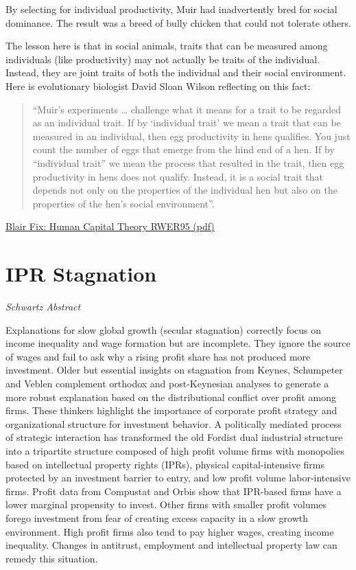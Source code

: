 \documentclass[
]{book}
\begin{document}
By selecting for individual productivity, Muir had inadvertently bred for social dominance.
The result was a breed of bully chicken that could not tolerate others.

The lesson here is that in social animals, traits that can be measured among individuals (like
productivity) may not actually be traits of the individual.
Instead, they are joint traits of both the individual and their social environment.
Here is evolutionary biologist David Sloan Wilson reflecting on this fact:

\begin{quote}
``Muir's experiments \ldots{} challenge what it means for a trait to be regarded as
an individual trait. If by `individual trait' we mean a trait that can be measured
in an individual, then egg productivity in hens qualifies. You just count the
number of eggs that emerge from the hind end of a hen. If by ``individual trait''
we mean the process that resulted in the trait, then egg productivity in hens
does not qualify. Instead, it is a social trait that depends not only on the
properties of the individual hen but also on the properties of the hen's social
environment''.
\end{quote}

\href{pdf/Fix_2021_Human_Capital_RWER95.pdf}{Blair Fix: Human Capital Theory RWER95 (pdf)}

\hypertarget{ipr-stagnation}{%
\section{IPR Stagnation}\label{ipr-stagnation}}

\emph{Schwartz Abstract}

Explanations for slow global growth (secular stagnation) correctly focus on income inequality and wage formation but are incomplete. They ignore the source of wages and fail to ask why a rising profit share has not produced more investment. Older but essential insights on stagnation from Keynes, Schumpeter and Veblen complement orthodox and post-Keynesian analyses to generate a more robust explanation based on the distributional conflict over profit among firms. These thinkers highlight the importance of corporate profit strategy and organizational structure for investment behavior. A politically mediated process of strategic interaction has transformed the old Fordist dual industrial structure into a tripartite structure composed of high profit volume firms with monopolies based on intellectual property rights (IPRs), physical capital-intensive firms protected by an investment barrier to entry, and low profit volume labor-intensive firms. Profit data from Compustat and Orbis show that IPR-based firms have a lower marginal propensity to invest. Other firms with smaller profit volumes forego investment from fear of creating excess capacity in a slow growth environment. High profit firms also tend to pay higher wages, creating income inequality. Changes in antitrust, employment and intellectual property law can remedy this situation.
\end{document}
